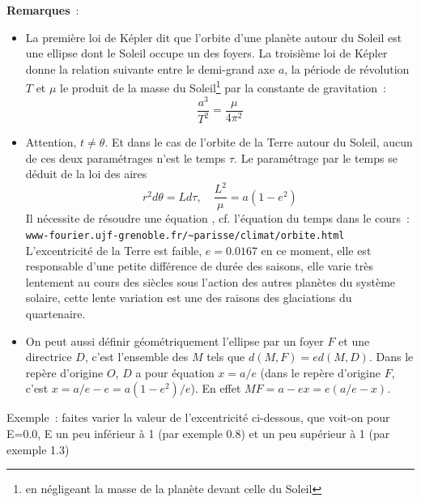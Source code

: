 \documentclass[a4paper,11pt]{book}
\begin{document}
\begin{giacjshere}
{\bf Remarques}~:
\begin{itemize}
\item La premi\`ere loi de K\'epler dit que l'orbite d'une plan\`ete
autour du Soleil est une ellipse dont le Soleil occupe un des foyers.
La troisi\`eme loi de K\'epler donne la relation suivante entre le
demi-grand axe $a$, la p\'eriode de r\'evolution $T$ et $\mu$
le produit de la masse du Soleil\footnote{en n\'egligeant la masse
de la plan\`ete devant celle du Soleil} par la constante de gravitation~:
$$ \frac{a^3}{T^2} = \frac{\mu}{4\pi^2}$$
\item Attention, $t\neq \theta$. Et dans le cas de l'orbite
de la Terre autour du Soleil, aucun de ces deux param\'etrages n'est
le temps $\tau$. Le param\'etrage par le temps se d\'eduit de la loi
des aires
\[ r^2 d\theta =  L d\tau , \quad
 \frac{L^2}{\mu}= a(1-e^2) \]
Il n\'ecessite de r\'esoudre
une \'equation , cf. l'\'equation du temps dans le cours~:\\
\verb|www-fourier.ujf-grenoble.fr/~parisse/climat/orbite.html|\\
L'excentricit\'e de la Terre est faible, $e=0.0167$ en
ce moment, elle est responsable d'une petite diff\'erence 
de dur\'ee des saisons, elle varie tr\`es lentement au cours des si\`ecles sous
l'action des autres plan\`etes du syst\`eme solaire, cette lente variation
est une des raisons des glaciations du quartenaire.
\item On peut aussi d\'efinir g\'eom\'etriquement l'ellipse
par un foyer $F$ et une directrice $D$, c'est l'ensemble des $M$ tels
que $d(M,F)=ed(M,D)$. Dans le rep\`ere d'origine $O$, $D$
a pour \'equation $x=a/e$ (dans le rep\`ere d'origine $F$, c'est
$x=a/e-e=a(1-e^2)/e$). En effet $MF=a-ex=e(a/e-x)$.
\end{itemize}
Exemple~: faites varier la valeur de l'excentricit\'e ci-dessous, que
voit-on pour E=0.0, E un peu inf\'erieur \`a 1 (par exemple 0.8) et un peu sup\'erieur
\`a 1 (par exemple 1.3)\\


\end{giacjshere}
\end{document}
